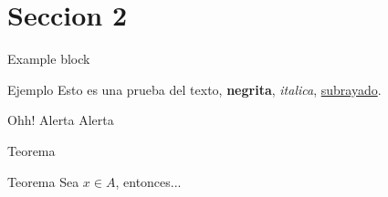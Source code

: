 \documentclass{beamer}
\begin{document}
\section{Seccion 2}
\begin{uis-frame}{Example block}
	\begin{exampleblock}{Ejemplo}
		Esto es una prueba del texto, \textbf{negrita}, \textit{italica}, \underline{subrayado}.
	\end{exampleblock}
	\begin{alertblock}{Ohh!}
	  Alerta Alerta
	\end{alertblock}
\end{uis-frame}

\begin{uis-frame}{Teorema}
	\begin{theorem}{Teorema}
		Sea $x\in A$, entonces...
	\end{theorem}
\end{uis-frame}

\uisthanks
\end{document}
